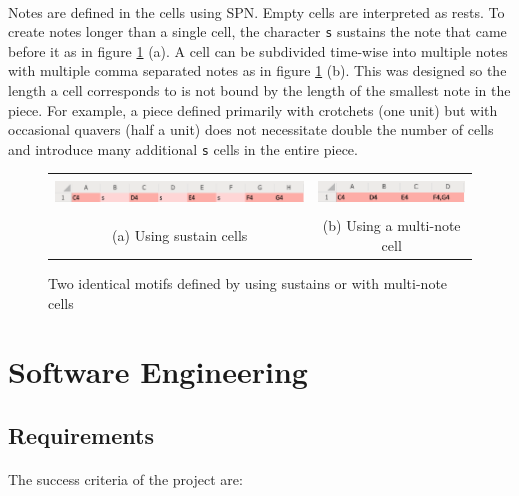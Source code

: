 \paragraph{} Notes are defined in the cells using SPN. Empty cells are interpreted as rests. To create notes longer than a single cell, the character \texttt{s} sustains the note that came before it as in figure \ref{prep:sustainMulti} (a). A cell can be subdivided time-wise into multiple notes with multiple comma separated notes as in figure \ref{prep:sustainMulti} (b). This was designed so the length a cell corresponds to is not bound by the length of the smallest note in the piece. For example, a piece defined primarily with crotchets (one unit) but with occasional quavers (half a unit) does not necessitate double the number of cells and introduce many additional \texttt{s} cells in the entire piece.

\begin{figure}[ht]
\begin{tabular}{cc}
  \includegraphics[height=8mm]{figs/withoutMulti.png} &
  \includegraphics[height=8mm]{figs/withMulti.png} \\
  (a) Using sustain cells&(b) Using a multi-note cell\\
\end{tabular}
\caption{Two identical motifs defined by using sustains or with multi-note cells}
\label{prep:sustainMulti}
\end{figure}

\section{Software Engineering}

\subsection{Requirements}

\paragraph{} The success criteria of the project are:

